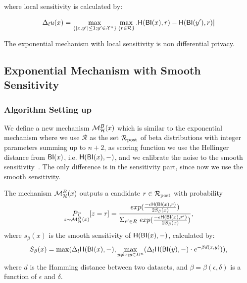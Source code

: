 \documentclass[sigconf, anonymous]{acmart}
\begin{document}
where local sensitivity is calculated by:

\begin{equation*}
\Delta_{l}u(x) = 
\max_{\{|x,y'| \leq 1;y'\in \mathcal{X}^n\}}\max_{\{r\in \mathcal{R}\}}.
\mathsf{H}(\mathsf{BI}(x), r) - \mathsf{H}(\mathsf{BI}(y'), r)|
\end{equation*}

The exponential mechanism with local sensitivity is non differential privacy\cite{dwork2014algorithmic}.


\subsection{Exponential Mechanism with Smooth Sensitivity}
\label{sec_smoo}

\subsubsection{Algorithm Setting up}
We define a new mechanism $\mathcal{M}^{B}_{\mathcal{H}}(x)$
which is similar to the exponential mechanism where we use
$\mathcal{R}$ as the set $\mathcal{R}_{\textup{post}}$ of beta distributions with integer parameters
summing up to $n+2$, as scoring function we use the Hellinger distance
from $\mathsf{BI}(x)$, i.e. $\mathsf{H}(\mathsf{BI}(x),-)$, and we 
calibrate the noise to the smooth sensitivity~\cite{nissim2007smooth}. The
only difference is in the sensitivity part, since now we use the
smooth sensitivity.

\begin{definition}
\label{def_smoo}
The mechanism $\mathcal{M}^{B}_{\mathcal{H}}(x)$ outputs a candidate $r \in \mathcal{R}_{\textup{post}}$ with probability
\begin{equation*}
\underset{z \thicksim \mathcal{M}^{B}_{\mathcal{H}}(x)}{Pr}[z=r] = \frac
{exp(\frac{-\epsilon\mathsf{H}(\mathsf{BI}(x),r)}{2 S_\beta(x)})}
{\Sigma_{r' \in R}\ exp(\frac{-\epsilon \mathsf{H}(\mathsf{BI}(x),r')}{2 S_\beta(x)})},
\end{equation*}
where $s_\beta(x)$ is the smooth sensitivity of $\mathsf{H}(\mathsf{BI}(x),-)$, calculated by:
\begin{equation*}
S_{\beta}(x) = \max(\Delta_{l}\mathsf{H}(\mathsf{BI}(x),-), \max_{y \neq x; y \in D^{n}}(\Delta_{l}\mathsf{H}(\mathsf{BI}(y),-)\cdot e^{-\beta d(x,y)})),
\end{equation*}
where $d$ is the Hamming distance between two datasets, and $\beta =
\beta(\epsilon, \delta)$ is a function of $\epsilon$ and $\delta$. 
\end{definition}
\end{document}
